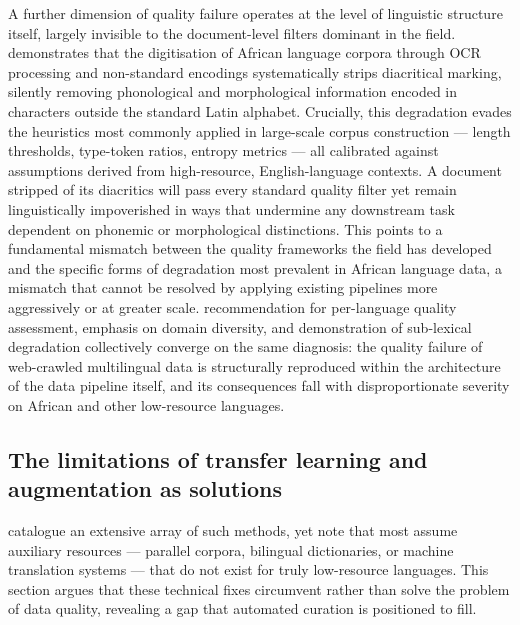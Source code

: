 \documentclass[11pt,a4paper]{article}
\begin{document}
A further dimension of quality failure operates at the level of linguistic structure itself, largely invisible to the document-level filters dominant in the field. \citet{de2007automatic} demonstrates that the digitisation of African language corpora through OCR processing and non-standard encodings systematically strips diacritical marking, silently removing phonological and morphological information encoded in characters outside the standard Latin alphabet. Crucially, this degradation evades the heuristics most commonly applied in large-scale corpus construction — length thresholds, type-token ratios, entropy metrics — all calibrated against assumptions derived from high-resource, English-language contexts. A document stripped of its diacritics will pass every standard quality filter yet remain linguistically impoverished in ways that undermine any downstream task dependent on phonemic or morphological distinctions. This points to a fundamental mismatch between the quality frameworks the field has developed and the specific forms of degradation most prevalent in African language data, a mismatch that cannot be resolved by applying existing pipelines more aggressively or at greater scale. \citet{tatariya2024good} recommendation for per-language quality assessment, \citet{kwon2026afroscope} emphasis on domain diversity, and \citet{de2007automatic} demonstration of sub-lexical degradation collectively converge on the same diagnosis: the quality failure of web-crawled multilingual data is structurally reproduced within the architecture of the data pipeline itself, and its consequences fall with disproportionate severity on African and other low-resource languages.

\subsection{The limitations of transfer learning and augmentation as solutions}
\citet{hedderich2021survey} catalogue an extensive array of such methods, yet note that most assume auxiliary resources — parallel corpora, bilingual dictionaries, or machine translation systems — that do not exist for truly low-resource languages. This section argues that these technical fixes circumvent rather than solve the problem of data quality, revealing a gap that automated curation is positioned to fill. 
\end{document}
